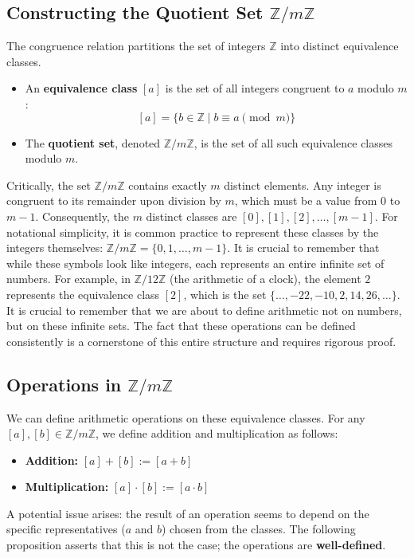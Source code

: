 \subsection{Constructing the Quotient Set $\mathbb{Z}/m\mathbb{Z}$}
The congruence relation partitions the set of integers $\mathbb{Z}$ into distinct equivalence classes.
\begin{itemize}
    \item An \textbf{equivalence class} $[a]$ is the set of all integers congruent to $a$ modulo $m$:
    $$ [a] = \{b \in \mathbb{Z} \mid b \equiv a \pmod{m}\} $$
    \item The \textbf{quotient set}, denoted $\mathbb{Z}/m\mathbb{Z}$, is the set of all such equivalence classes modulo $m$.
\end{itemize}
Critically, the set $\mathbb{Z}/m\mathbb{Z}$ contains exactly $m$ distinct elements. Any integer is congruent to its remainder upon division by $m$, which must be a value from $0$ to $m-1$. Consequently, the $m$ distinct classes are $[0], [1], [2], \dots, [m-1]$.
For notational simplicity, it is common practice to represent these classes by the integers themselves: $\mathbb{Z}/m\mathbb{Z} = \{0, 1, \dots, m-1\}$.
It is crucial to remember that while these symbols look like integers, each represents an entire infinite set of numbers. For example, in $\mathbb{Z}/12\mathbb{Z}$ (the arithmetic of a clock), the element $2$ represents the equivalence class $[2]$, which is the set $\{\dots, -22, -10, 2, 14, 26, \dots\}$. It is crucial to remember that we are about to define arithmetic not on numbers, but on these infinite sets. The fact that these operations can be defined consistently is a cornerstone of this entire structure and requires rigorous proof.

\subsection{Operations in $\mathbb{Z}/m\mathbb{Z}$}
We can define arithmetic operations on these equivalence classes. For any $[a], [b] \in \mathbb{Z}/m\mathbb{Z}$, we define addition and multiplication as follows:
\begin{itemize}
    \item \textbf{Addition:} $[a] + [b] := [a + b]$
    \item \textbf{Multiplication:} $[a] \cdot [b] := [a \cdot b]$
\end{itemize}
A potential issue arises: the result of an operation seems to depend on the specific representatives ($a$ and $b$) chosen from the classes. The following proposition asserts that this is not the case; the operations are \textbf{well-defined}.

